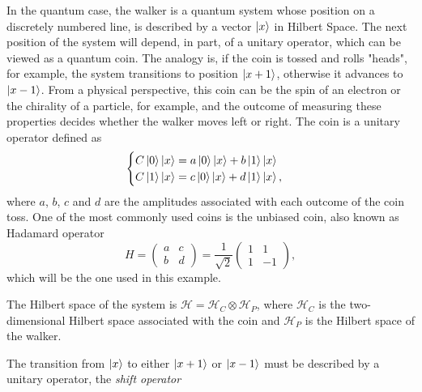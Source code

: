 \documentclass[../../dissertation.tex]{subfiles}
\begin{document}
In the quantum case, the walker is a quantum system whose position on a
discretely numbered line, is described by a vector $\ket{x}$ in Hilbert Space.
The next position of the system will depend, in part, of a unitary operator,
which can be viewed as a quantum coin.
The analogy is, if the coin is tossed and rolls "heads", for example, the
system transitions to position $\ket{x+1}$, otherwise it advances to
$\ket{x-1}$. From a physical perspective, this coin can be the spin of an
electron or the chirality of a particle, for example, and the outcome of
measuring these properties decides whether the walker moves left or right. The
coin is a unitary operator defined as
\begin{equation}
	\begin{cases}
		C\ket{0}\ket{x} = a\ket{0}\ket{x} + b\ket{1}\ket{x}\\
		C\ket{1}\ket{x} = c\ket{0}\ket{x} + d\ket{1}\ket{x},
	\end{cases}
\end{equation}
where $a$, $b$, $c$ and $d$ are the amplitudes associated with each outcome of
the coin toss. One of the most commonly used coins is the unbiased coin, also
known as Hadamard operator
\begin{equation}
	H = \begin{pmatrix} 
		a & c\\
		b & d
	    \end{pmatrix}
	    =\frac{1}{\sqrt{2}} \begin{pmatrix}
			    		1 & 1\\
					1 & -1
	   		       \end{pmatrix},
\end{equation}
which will be the one used in this example.\par 
The Hilbert space of the system is $\mathscr{H} = \mathscr{H}_{C} \otimes
\mathscr{H}_{P}$, where $\mathscr{H}_{C}$ is the two-dimensional Hilbert space
associated with the coin and $\mathscr{H}_P$ is the Hilbert space of the
walker.\par The transition from $\ket{x}$ to either $\ket{x+1}$ or $\ket{x-1}$
must be described by a unitary operator, the \textit{shift operator} 
\end{document}
